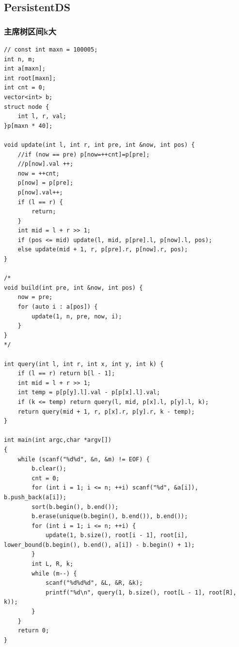 \documentclass[twoside]{article}
\begin{document}
\subsection{PersistentDS}
\subsubsection{主席树区间k大}
\begin{lstlisting}
// const int maxn = 100005;
int n, m;
int a[maxn];
int root[maxn];
int cnt = 0;
vector<int> b;
struct node {
    int l, r, val;
}p[maxn * 40];

void update(int l, int r, int pre, int &now, int pos) {
    //if (now == pre) p[now=++cnt]=p[pre];
    //p[now].val ++;
    now = ++cnt;
    p[now] = p[pre];
    p[now].val++;
    if (l == r) {
        return;
    }
    int mid = l + r >> 1;
    if (pos <= mid) update(l, mid, p[pre].l, p[now].l, pos);
    else update(mid + 1, r, p[pre].r, p[now].r, pos);
}

/*
void build(int pre, int &now, int pos) {
    now = pre;
    for (auto i : a[pos]) {
        update(1, n, pre, now, i);
    }
}
*/

int query(int l, int r, int x, int y, int k) {
    if (l == r) return b[l - 1];
    int mid = l + r >> 1;
    int temp = p[p[y].l].val - p[p[x].l].val;
    if (k <= temp) return query(l, mid, p[x].l, p[y].l, k);
    return query(mid + 1, r, p[x].r, p[y].r, k - temp);
}

int main(int argc,char *argv[])
{
    while (scanf("%d%d", &n, &m) != EOF) {
        b.clear();
        cnt = 0;
        for (int i = 1; i <= n; ++i) scanf("%d", &a[i]), b.push_back(a[i]);
        sort(b.begin(), b.end());
        b.erase(unique(b.begin(), b.end()), b.end());
        for (int i = 1; i <= n; ++i) {
            update(1, b.size(), root[i - 1], root[i], lower_bound(b.begin(), b.end(), a[i]) - b.begin() + 1);
        }
        int L, R, k;
        while (m--) {
            scanf("%d%d%d", &L, &R, &k);
            printf("%d\n", query(1, b.size(), root[L - 1], root[R], k));
        }
    }
    return 0;
}\end{lstlisting}
\end{document}

